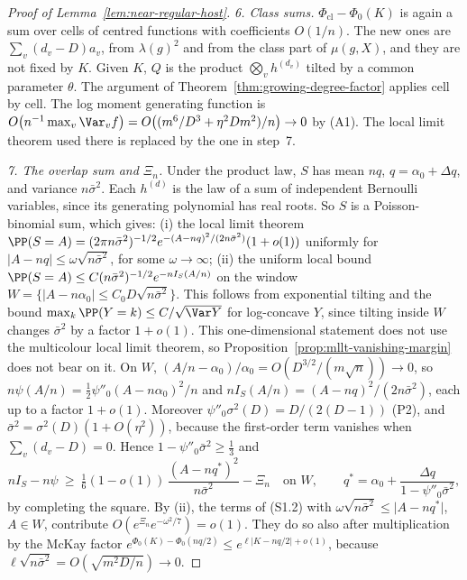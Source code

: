 \begin{proof}[Proof of Lemma~\ref{lem:near-regular-host}]
\emph{6. Class sums.} \(\Phi_{\mathrm{cl}}-\Phi_0(K)\) is again a sum over cells of
centred functions with coefficients \(O(1/n)\). The new ones are
\(\sum_v(d_v-D)a_v\), from \(\lambda(g)^2\) and from the class part of
\(\mu(g,X)\), and they are not fixed by \(K\). Given \(K\), \(Q\) is the product
\(\bigotimes_vh^{(d_v)}\) tilted by a common parameter \(\theta\). The
argument of Theorem~\ref{thm:growing-degree-factor} applies cell by cell. The
log moment generating function is
\(O\bigl(n^{-1}\max_v\Var_v f\bigr)=O\bigl((m^6/D^3+\eta^2Dm^2)/n\bigr)\to0\)
by (A1). The local limit theorem used there is replaced by the one in step~7.

\emph{7. The overlap sum and \(\Xi_n\).} Under the product law, \(S\) has mean
\(nq\), \(q=\alpha_0+\Delta q\), and variance \(n\bar\sigma^2\). Each \(h^{(d)}\) is
the law of a sum of independent Bernoulli variables, since its generating
polynomial has real roots. So \(S\) is a Poisson-binomial sum, which
gives:
(i) the local limit theorem
\(\PP(S=A)=(2\pi n\bar\sigma^2)^{-1/2}e^{-(A-nq)^2/(2n\bar\sigma^2)}(1+o(1))\)
uniformly for \(\lvert A-nq\rvert\le\omega\sqrt{n\bar\sigma^2}\), for some
\(\omega\to\infty\);
(ii) the uniform local bound
\(\PP(S=A)\le C(n\bar\sigma^2)^{-1/2}e^{-nI_S(A/n)}\) on the window
\(W=\{\lvert A-n\alpha_0\rvert\le C_0D\sqrt{n\bar\sigma^2}\}\). This follows from
exponential tilting and the bound \(\max_k\PP(Y=k)\le C/\sqrt{\Var Y}\) for
log-concave \(Y\), since tilting inside \(W\) changes \(\bar\sigma^2\) by a factor
\(1+o(1)\).
This one-dimensional statement does not use the multicolour local limit
theorem, so Proposition~\ref{prop:mllt-vanishing-margin} does not bear on it.
On \(W\), \((A/n-\alpha_0)/\alpha_0=O(D^{3/2}/(m\sqrt n))\to0\), so
\(n\psi(A/n)=\tfrac12\psi''_0(A-n\alpha_0)^2/n\) and
\(nI_S(A/n)=(A-nq)^2/(2n\bar\sigma^2)\), each up to a factor \(1+o(1)\).
Moreover \(\psi''_0\sigma^2(D)=D/(2(D-1))\) (P2), and
\(\bar\sigma^2=\sigma^2(D)(1+O(\eta^2))\), because the first-order term vanishes
when \(\sum_v(d_v-D)=0\). Hence \(1-\psi''_0\bar\sigma^2\ge\tfrac13\) and
\[
nI_S-n\psi\ \ge\ \tfrac16(1-o(1))\,\frac{(A-nq^*)^2}{n\bar\sigma^2}-\Xi_n
\quad\text{on }W,
\qquad q^*=\alpha_0+\frac{\Delta q}{1-\psi''_0\bar\sigma^2},
\]
by completing the square. By (ii), the terms of
(S1.2) with \(\omega\sqrt{n\bar\sigma^2}\le\lvert A-nq^*\rvert\), \(A\in W\),
contribute \(O(e^{\Xi_n}e^{-\omega^2/7})=o(1)\). They do so also after
multiplication by the McKay factor \(e^{\Phi_0(K)-\Phi_0(nq/2)}\le
e^{\ell\lvert K-nq/2\rvert+o(1)}\), because \(\ell\sqrt{n\bar\sigma^2}=O(\sqrt{m^2D/n})\to0\).

\end{proof}
